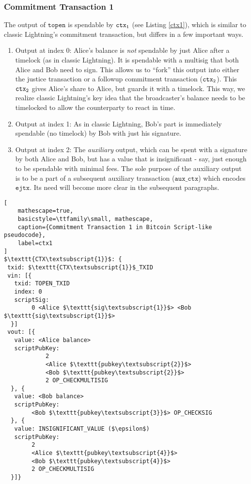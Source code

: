 \subsubsection{Commitment Transaction 1}
The output of $\texttt{topen}$ is spendable by $\texttt{ctx\textsubscript{1}}$ (see Listing \ref{ctx1}), which is similar to classic Lightning's commitment transaction, but differs in a few important ways.
\begin{enumerate}
    \item Output at index 0: Alice's balance is \textit{not} spendable by just Alice after a timelock (as in classic Lightning). It is spendable with a multisig that both Alice and Bob need to sign. This allows us to ``fork'' this output into either the justice transaction or a followup commitment transaction ($\texttt{ctx\textsubscript{2}}$). This $\texttt{ctx\textsubscript{2}}$ gives Alice's share to Alice, but guards it with a timelock. This way, we realize classic Lightning's key idea that the broadcaster's balance needs to be timelocked to allow the counterparty to react in time.
    \item Output at index 1: As in classic Lightning, Bob's part is immediately spendable (no timelock) by Bob with just his signature.
    \item Output at index 2: The \textit{auxiliary} output, which can be spent with a signature by both Alice and Bob, but has a value that is insignificant - say, just enough to be spendable with minimal fees. The sole purpose of the auxiliary output is to be a part of a subsequent auxiliary transaction ($\texttt{aux\_ctx}$) which encodes $\texttt{ejtx}$. Its need will become more clear in the subsequent paragraphs.
\end{enumerate}

\begin{lstlisting}[
    mathescape=true,
    basicstyle=\ttfamily\small, mathescape,
    caption={Commitment Transaction 1 in Bitcoin Script-like pseudocode},
    label=ctx1
]
$\texttt{CTX\textsubscript{1}}$: {
 txid: $\texttt{CTX\textsubscript{1}}$_TXID
 vin: [{
   txid: TOPEN_TXID
   index: 0
   scriptSig: 
        0 <Alice $\texttt{sig\textsubscript{1}}$> <Bob $\texttt{sig\textsubscript{1}}$>
  }]
 vout: [{
   value: <Alice balance>
   scriptPubKey:
            2 
            <Alice $\texttt{pubkey\textsubscript{2}}$> 
            <Bob $\texttt{pubkey\textsubscript{2}}$> 
            2 OP_CHECKMULTISIG
  }, {
   value: <Bob balance>
   scriptPubKey: 
        <Bob $\texttt{pubkey\textsubscript{3}}$> OP_CHECKSIG
  }, {
   value: INSIGNIFICANT_VALUE ($\epsilon$)
   scriptPubKey: 
        2 
        <Alice $\texttt{pubkey\textsubscript{4}}$> 
        <Bob $\texttt{pubkey\textsubscript{4}}$> 
        2 OP_CHECKMULTISIG
  }]}
\end{lstlisting}

